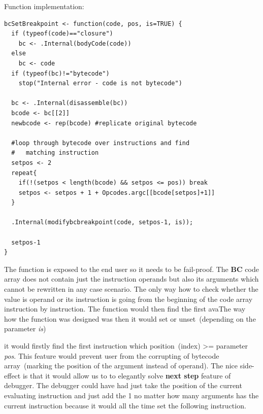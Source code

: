 \documentclass[thesis=M,english]{FITthesis}[2018/10/20]
\begin{document}
Function implementation:
\begin{lstlisting}
bcSetBreakpoint <- function(code, pos, is=TRUE) {
  if (typeof(code)=="closure")
    bc <- .Internal(bodyCode(code))
  else
    bc <- code
  if (typeof(bc)!="bytecode") 
    stop("Internal error - code is not bytecode")

  bc <- .Internal(disassemble(bc))
  bcode <- bc[[2]]
  newbcode <- rep(bcode) #replicate original bytecode

  #loop through bytecode over instructions and find 
  #   matching instruction
  setpos <- 2
  repeat{
    if(!(setpos < length(bcode) && setpos <= pos)) break
    setpos <- setpos + 1 + Opcodes.argc[[bcode[setpos]+1]]
  }

  .Internal(modifybcbreakpoint(code, setpos-1, is));

  setpos-1
}
\end{lstlisting}

The function is exposed to the end user so it needs to be fail-proof. The \textbf{BC} code array does not contain just the instruction operands but also its arguments which cannot be rewritten in any case scenario. The only way how to check whether the value is operand or its instruction  is going from the beginning of the code array instruction by instruction. The function would then find the first avaThe way how the function was designed was then it would set or unset~(depending on the parameter \textit{is})

 it would firstly find the first instruction which position~(index) >= parameter \textit{pos}. This feature would prevent user from the corrupting of bytecode array~(marking the position of the argument instead of operand). The nice side-effect is that it would allow us to to elegantly solve \textbf{next step} feature of debugger. The debugger could have had just take the position of the current evaluating instruction and just add the 1 no matter how many arguments has the current instruction because it would all the time set the following instruction.
\end{document}
